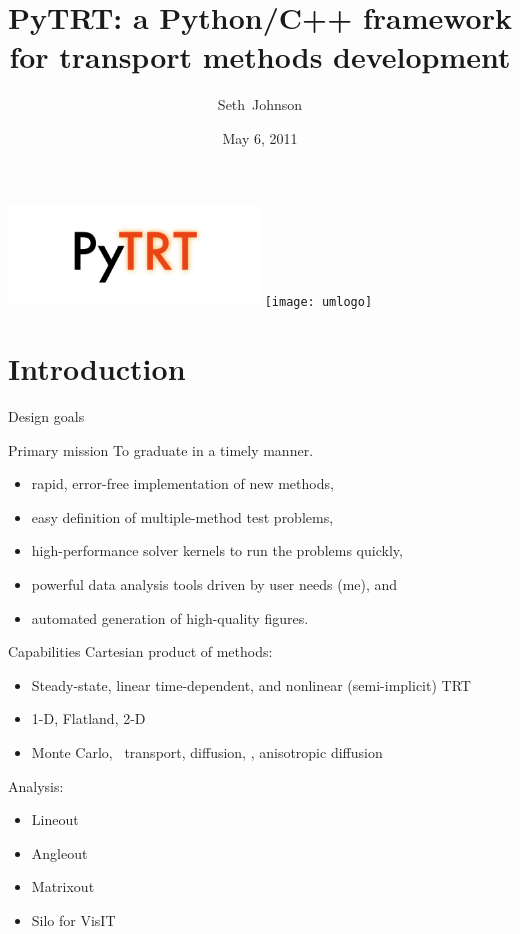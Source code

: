 \documentclass{beamer}
\title[PyTRT]%
{PyTRT: a Python/C++ framework for transport methods development}
\author[SRJ]{Seth~Johnson}
\institute[UMich]{
University of Michigan, Ann Arbor
}
\date[5/6/2011]{May 6, 2011}
\begin{document}

\begin{frame}
\titlepage
\vspace{-.25in}
\begin{center}
  \includegraphics[width=0.5\textwidth]{logo}
  \hspace{.5in}
  \texttt{[image: umlogo]}
\end{center}
\end{frame}

\section{Introduction}
\begin{frame}{Design goals}
\begin{block}{Primary mission}
   To graduate in a timely manner.
\end{block}


\begin{itemize}
  \item rapid, error-free implementation of new methods,
  \item easy definition of multiple-method test problems,
  \item high-performance solver kernels to run the problems quickly,
  \item powerful data analysis tools driven by user needs (me), and
  \item automated generation of high-quality figures.
\end{itemize}
  
\end{frame}

\begin{frame}{Capabilities}
Cartesian product of methods:
\begin{itemize}
  \item Steady-state, linear time-dependent, and nonlinear (semi-implicit)
    TRT
  \item 1-D, Flatland, 2-D
  \item Monte Carlo, \SN\ transport, diffusion, \Pone, anisotropic diffusion
\end{itemize}

Analysis:
\begin{itemize}
  \item Lineout
  \item Angleout
  \item Matrixout
  \item Silo for VisIT
\end{itemize}
  
\end{frame}
\end{document}
